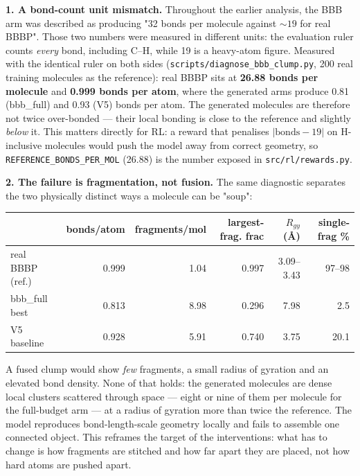\documentclass[12pt, a4paper]{article}
\begin{document}
\textbf{1. A bond-count unit mismatch.} Throughout the earlier analysis, the
BBB arm was described as producing "32 bonds per molecule against ${\sim}19$
for real BBBP". Those two numbers were measured in different units: the
evaluation ruler counts \emph{every} bond, including C--H, while 19 is a
heavy-atom figure. Measured with the identical ruler on both sides
(\texttt{scripts/diagnose\_bbb\_clump.py}, 200 real training molecules as the
reference): real BBBP sits at \textbf{26.88 bonds per molecule} and
\textbf{0.999 bonds per atom}, where the generated arms produce 0.81
(bbb\_full) and 0.93 (V5) bonds per atom. The generated molecules are
therefore not twice over-bonded --- their local bonding is close to the
reference and slightly \emph{below} it. This matters directly for RL: a reward
that penalises $|\text{bonds} - 19|$ on H-inclusive molecules would push the
model away from correct geometry, so \texttt{REFERENCE\_BONDS\_PER\_MOL}
(26.88) is the number exposed in \texttt{src/rl/rewards.py}.

\textbf{2. The failure is fragmentation, not fusion.} The same diagnostic
separates the two physically distinct ways a molecule can be "soup":

\begin{center}
\begin{tabular}{lrrrrr}
\toprule
 & bonds/atom & fragments/mol & largest-frag. frac & $R_{gy}$ (\AA{}) & single-frag \% \\
\midrule
real BBBP (ref.)   & 0.999 & 1.04 & 0.997 & 3.09--3.43 & 97--98 \\
bbb\_full best     & 0.813 & 8.98 & 0.296 & 7.98       & 2.5  \\
V5 baseline        & 0.928 & 5.91 & 0.740 & 3.75       & 20.1 \\
\bottomrule
\end{tabular}
\end{center}

A fused clump would show \emph{few} fragments, a small radius of gyration and
an elevated bond density. None of that holds: the generated molecules are
dense local clusters scattered through space --- eight or nine of them per
molecule for the full-budget arm --- at a radius of gyration more than twice
the reference. The model reproduces bond-length-scale geometry locally and
fails to assemble one connected object. This reframes the target of the
interventions: what has to change is how fragments are stitched and how far
apart they are placed, not how hard atoms are pushed apart.
\end{document}
